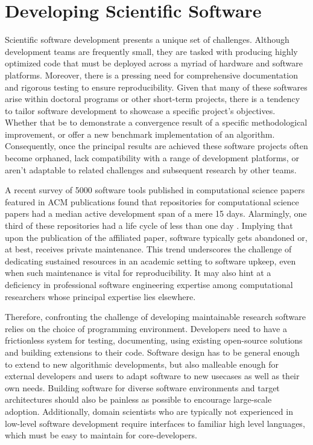 \section{Developing Scientific Software}\label{chpt:1:sec:0}

Scientific software development presents a unique set of challenges. Although development teams are frequently small, they are tasked with producing highly optimized code that must be deployed across a myriad of hardware and software platforms. Moreover, there is a pressing need for comprehensive documentation and rigorous testing to ensure reproducibility. Given that many of these softwares arise within doctoral programs or other short-term projects, there is a tendency to tailor software development to showcase a specific project's objectives. Whether that be to demonstrate a convergence result of a specific methodological improvement, or offer a new benchmark implementation of an algorithm. Consequently, once the principal results are achieved these software projects often become orphaned, lack compatibility with a range of development platforms, or aren't adaptable to related challenges and subsequent research by other teams.

A recent survey of 5000 software tools published in computational science papers featured in ACM publications found that repositories for computational science papers had a median active development span of a mere 15 days. Alarmingly, one third of these repositories had a life cycle of less than one day \cite{hasselbring2020open}. Implying that upon the publication of the affiliated paper, software typically gets abandoned or, at best, receives private maintenance. This trend underscores the challenge of dedicating sustained resources in an academic setting to software upkeep, even when such maintenance is vital for reproducibility. It may also hint at a deficiency in professional software engineering expertise among computational researchers whose principal expertise lies elsewhere.

Therefore, confronting the challenge of developing maintainable research software relies on the choice of programming environment. Developers need to have a frictionless system for testing, documenting, using existing open-source solutions and building extensions to their code. Software design has to be general enough to extend to new algorithmic developments, but also malleable enough for external developers and users to adapt software to new usecases as well as their own needs. Building software for diverse software environments and target architectures should also be painless as possible to encourage large-scale adoption. Additionally, domain scientists who are typically not experienced in low-level software development require interfaces to familiar high level languages, which must be easy to maintain for core-developers.

